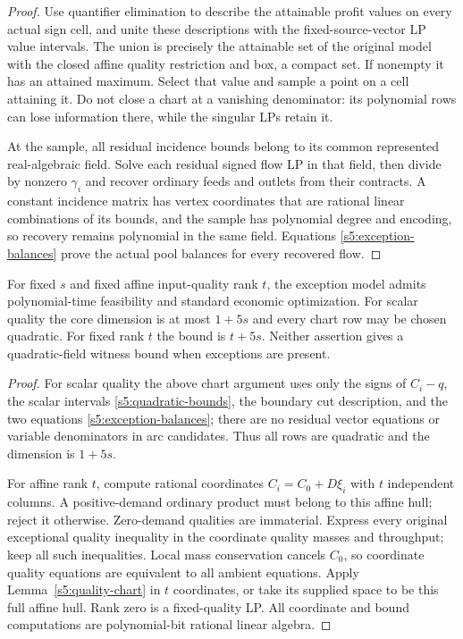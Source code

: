 \begin{proof}
Use quantifier elimination to describe the attainable profit values
on every actual sign cell, and unite these descriptions with the
fixed-source-vector LP value intervals. The union is precisely the
attainable set of the original model with the closed affine quality
restriction and box, a compact set. If nonempty it has an attained
maximum. Select that value and sample a point on a cell attaining it.
Do not close a chart at a vanishing denominator: its polynomial rows
can lose information there, while the singular LPs retain it.

At the sample, all residual incidence bounds belong to its common
represented real-algebraic field. Solve each residual signed flow LP
in that field, then divide by nonzero $\gamma_i$ and recover ordinary
feeds and outlets from their contracts. A constant incidence matrix
has vertex coordinates that are rational linear combinations of its
bounds, and the sample has polynomial degree and encoding, so
recovery remains polynomial in the same field. Equations
\eqref{s5:exception-balances} prove the actual pool balances for every
recovered flow.
\end{proof}

\begin{corollary}\label{s5:fixed-rank}
For fixed $s$ and fixed affine input-quality rank $t$, the exception
model admits polynomial-time feasibility and standard economic
optimization. For scalar quality the core dimension is at most $1+5s$
and every chart row may be chosen quadratic. For fixed rank $t$ the
bound is $t+5s$. Neither assertion gives a quadratic-field witness
bound when exceptions are present.
\end{corollary}
\begin{proof}
For scalar quality the above chart argument uses only the signs of
$C_i-q$, the scalar intervals \eqref{s5:quadratic-bounds}, the boundary
cut description, and the two equations
\eqref{s5:exception-balances}; there are no residual vector equations
or variable denominators in arc candidates. Thus all rows are quadratic
and the dimension is $1+5s$.

For affine rank $t$, compute rational coordinates
$C_i=C_0+D\xi_i$ with $t$ independent columns. A positive-demand
ordinary product must belong to this affine hull; reject it otherwise.
Zero-demand qualities are immaterial. Express every original exceptional
quality inequality in the coordinate quality masses and throughput;
keep all such inequalities. Local mass conservation cancels $C_0$, so
coordinate quality equations are equivalent to all ambient equations.
Apply Lemma~\ref{s5:quality-chart} in $t$ coordinates, or take its
supplied space to be this full affine hull. Rank zero is a fixed-quality
LP. All coordinate and bound computations are polynomial-bit rational
linear algebra.
\end{proof}

